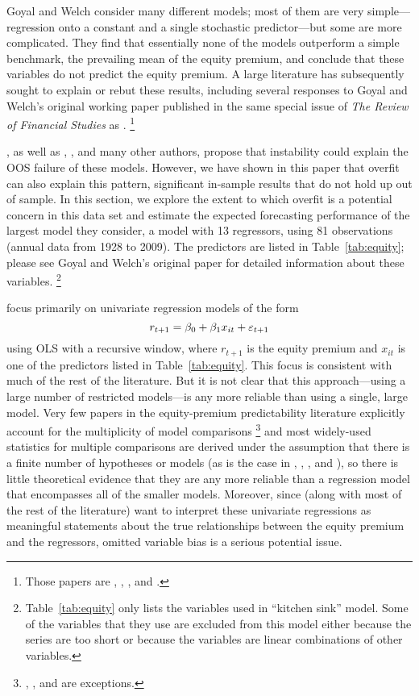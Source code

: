 \documentclass[12pt]{article}
\begin{document}
Goyal and Welch consider many different models; most of them are very
simple---regression onto a constant and a single stochastic
predictor---but some are more complicated. They find that essentially
none of the models outperform a simple benchmark, the prevailing mean
of the equity premium, and conclude that these variables do not
predict the equity premium. A large literature has subsequently sought
to explain or rebut these results, including several responses to
Goyal and Welch's original working paper published in the same special
issue of \textit{The Review of Financial Studies} as \citet{GoW:08}.%
\footnote{Those papers are \citet{CaT:08}, \citet{Coc:08},
  \citet{BRW:08}, and \citet{LeN:08}.} %

\citet{GoW:08}, as well as \citet{BoH:99}, \citet{LeN:08}, and many
other authors, propose that instability could explain the OOS failure
of these models. However, we have shown in this paper that overfit can
also explain this pattern, significant in-sample results that do not
hold up out of sample. In this section, we explore the extent to which
overfit is a potential concern in this data set and estimate the
expected forecasting performance of the largest model they consider, a
model with 13 regressors, using 81 observations (annual data from 1928
to 2009). The predictors are listed in Table~\ref{tab:equity}; please
see Goyal and Welch's original paper for detailed information about
these variables.%
\footnote{Table~\ref{tab:equity} only lists the variables used in
   ``kitchen sink'' model.  Some of the variables that
  they use are excluded from this model either
  because the series are too short or because the variables are linear
  combinations of other variables.} %

\citet{GoW:08} focus primarily on univariate regression models of the
form
\[
r_{t+1} = \beta_0 + \beta_1 x_{it} + \varepsilon_{t+1}
\]
using OLS with a recursive window, where $r_{t+1}$ is the equity
premium and $x_{it}$ is one of the predictors listed in
Table~\ref{tab:equity}.
This focus is consistent with much of the rest of the literature. But
it is not clear that this approach---using a large number of
restricted models---is any more reliable than using a single, large
model. Very few papers in the equity-premium predictability literature
explicitly account for the multiplicity of model comparisons%
\footnote{\citet{RaW:06}, \citet{RaZ:12}, and \citet{Cal:13b} are
  exceptions.} %
and most widely-used statistics for multiple comparisons are
derived under the assumption that there is a finite number of
hypotheses or models (as is the case in \citealp{STW:99c},
\citealp{Whi:00}, \citealp{Han:05}, and \citealp{LeR:05}), so there is
little theoretical evidence that they are any more reliable than a
regression model that encompasses all of the smaller models. Moreover,
since \citet{GoW:08} (along with most of the rest of the literature)
want to interpret these univariate regressions as meaningful
statements about the true relationships between the equity premium and
the regressors, omitted variable bias is a serious potential issue.
\end{document}
